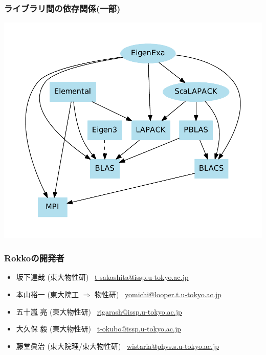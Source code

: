 \begin{frame}
  \frametitle{ライブラリ間の依存関係(一部)}
  \begin{center}
    \includegraphics[height=0.8\textheight]{figure/library-dependence.pdf}
  \end{center}
\end{frame}

\begin{frame}
  \frametitle{Rokkoの開発者}
  \begin{itemize}
    \setlength{\itemsep}{1em}
  \item 坂下達哉 (東大物性研) \ \href{mailto:t-sakashita@issp.u-tokyo.ac.jp}{t-sakashita@issp.u-tokyo.ac.jp}
  \item 本山裕一 (東大院工 $\Rightarrow $ 物性研) \ \href{mailto:yomichi@looper.u-tokyo.ac.jp}{yomichi@looper.t.u-tokyo.ac.jp}
  \item 五十嵐 亮 (東大物性研) \ \href{mailto:rigarash@issp.u-tokyo.ac.jp}{rigarash@issp.u-tokyo.ac.jp}
  \item 大久保 毅 (東大物性研) \ \href{mailto:t-okubo@issp.u-tokyo.ac.jp}{t-okubo@issp.u-tokyo.ac.jp}
  \item 藤堂眞治 (東大院理/東大物性研) \ \href{mailto:wistaria@phys.s.u-tokyo.ac.jp}{wistaria@phys.s.u-tokyo.ac.jp}
  \end{itemize}
\end{frame}


